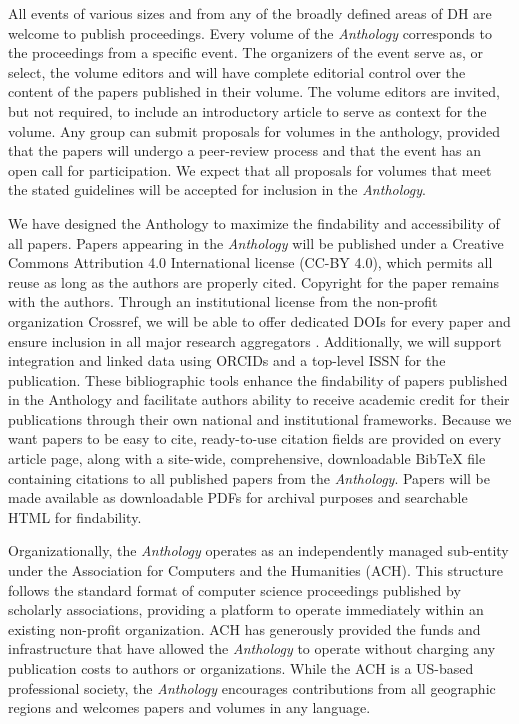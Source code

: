 \documentclass[final]{anthology-ch} %
\begin{document}
All events of various sizes and from any of the broadly defined areas of
DH are welcome to publish proceedings. Every volume of the
\emph{Anthology} corresponds to the proceedings from a specific event.
The organizers of the event serve as, or select, the volume editors and
will have complete editorial control over the content of the papers
published in their volume. The volume editors are invited, but not
required, to include an introductory article to serve as context for the
volume. Any group can submit proposals for volumes in the anthology,
provided that the papers will undergo a peer-review process and that the
event has an open call for participation. We expect that all proposals
for volumes that meet the stated guidelines will be accepted for
inclusion in the \emph{Anthology}.

We have designed the Anthology to maximize the findability and
accessibility of all papers. Papers appearing in the \emph{Anthology}
will be published under a Creative Commons Attribution 4.0 International
license (CC-BY 4.0), which permits all reuse as long as the authors are
properly cited. Copyright for the paper remains with the authors.
Through an institutional license from the non-profit organization
Crossref, we will be able to offer dedicated DOIs for every paper and
ensure inclusion in all major research aggregators
\cite{chandrakar2006digital, hendricks2020crossref}. Additionally, we
will support integration and linked data using ORCIDs and a top-level
ISSN for the publication. These bibliographic tools enhance the
findability of papers published in the Anthology and facilitate
authors\textquotesingle{} ability to receive academic credit for their
publications through their own national and institutional frameworks.
Because we want papers to be easy to cite, ready-to-use citation fields
are provided on every article page, along with a site-wide,
comprehensive, downloadable BibTeX file containing citations to all
published papers from the \emph{Anthology}. Papers will be made
available as downloadable PDFs for archival purposes and searchable HTML
for findability.

Organizationally, the \emph{Anthology} operates as an independently
managed sub-entity under the Association for Computers and the
Humanities (ACH). This structure follows the standard format of computer
science proceedings published by scholarly associations, providing a
platform to operate immediately within an existing non-profit
organization. ACH has generously provided the funds and infrastructure
that have allowed the \emph{Anthology} to operate without charging any
publication costs to authors or organizations. While the ACH is a
US-based professional society, the \emph{Anthology} encourages
contributions from all geographic regions and welcomes papers and
volumes in any language.
\end{document}
